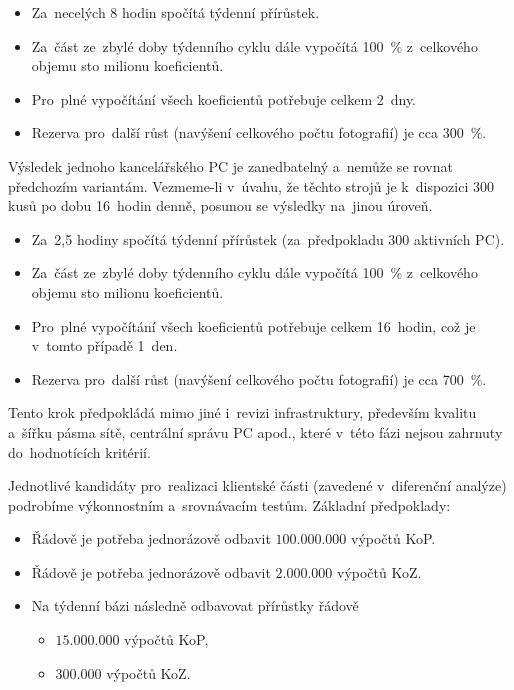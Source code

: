 \begin{itemize}
	\setlength{\parskip}{0pt}
	\setlength{\itemsep}{0pt}
	\item {Za~necelých 8 hodin spočítá týdenní přírůstek.}
	\item {Za~část ze~zbylé doby týdenního cyklu dále vypočítá 100~\% z~celkového objemu sto milionu koeficientů.}
	\item {Pro~plné vypočítání všech koeficientů potřebuje celkem 2~dny.}
	\item {Rezerva pro~další růst (navýšení celkového počtu fotografií) je cca 300~\%.}
\end{itemize}

Výsledek jednoho kancelářského PC je zanedbatelný a~nemůže se rovnat předchozím variantám. Vezmeme-li v~úvahu, že těchto strojů je k~dispozici 300 kusů po dobu 16~hodin denně, posunou se výsledky na~jinou úroveň.

\begin{itemize}
	\setlength{\parskip}{0pt}
	\setlength{\itemsep}{0pt}
	\item {Za~2,5 hodiny spočítá týdenní přírůstek (za~předpokladu 300 aktivních PC).}
	\item {Za~část ze~zbylé doby týdenního cyklu dále vypočítá 100~\% z~celkového objemu sto milionu koeficientů.}
	\item {Pro~plné vypočítání všech koeficientů potřebuje celkem 16~hodin, což je v~tomto případě 1~den.}
	\item {Rezerva pro~další růst (navýšení celkového počtu fotografií) je cca 700~\%.}
\end{itemize}

Tento krok předpokládá mimo jiné i~revizi infrastruktury, především kvalitu a~šířku pásma sítě, centrální správu PC apod., které v~této fázi nejsou zahrnuty do~hodnotících kritérií.

Jednotlivé kandidáty pro~realizaci klientské části (zavedené v~diferenční analýze) podrobíme výkonnostním a~srovnávacím testům.
Základní předpoklady:
\begin{itemize}
	\setlength{\parskip}{0pt}
	\setlength{\itemsep}{0pt}
	\item {Řádově je potřeba jednorázově odbavit $ 100.000.000 $ výpočtů KoP.}
	\item {Řádově je potřeba jednorázově odbavit $ 2.000.000 $ výpočtů KoZ.}
	\item {Na týdenní bázi následně odbavovat přírůstky řádově}
	\begin{itemize}
		\setlength{\parskip}{0pt}
		\setlength{\itemsep}{0pt}
		\item {$ 15.000.000 $ výpočtů KoP,}
		\item {$ 300.000 $ výpočtů KoZ}.
	\end{itemize}
\end{itemize}

